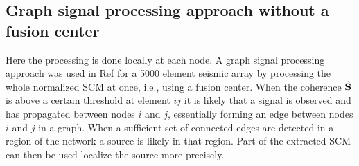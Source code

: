 
\subsection{Graph signal processing approach without a fusion center}

Here the processing is done locally at each node. A graph signal processing approach was used in Ref \cite{riahi2017} for a 5000 element seismic array by processing the whole normalized SCM at once, i.e., using a fusion center. 
When the coherence $\hat{\bf S}$ is above a certain threshold at  element $ij$ it is likely that a signal is observed and has propagated between nodes $i$ and $j$, essentially forming an edge between nodes  $i$ and $j$ in a graph. When a sufficient set of connected edges are detected in a region of the network a source is likely in that region. Part of the extracted SCM can then be used localize the source more precisely.

